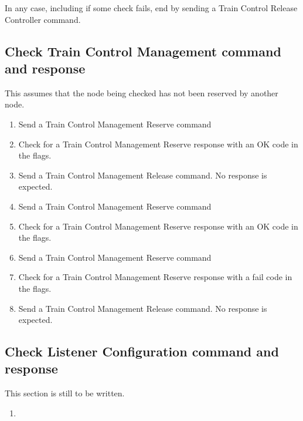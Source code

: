 In any case, including if some check fails, end by sending a Train Control Release
Controller command.


\subsection{Check Train Control Management command and response}

This assumes that the node being checked has not been reserved by another node.

\begin{enumerate}

    \item Send a Train Control Management Reserve command
    \item Check for a Train Control Management Reserve response with an OK code in the flags.

    \item Send a Train Control Management Release command.  No response is expected.

    \item Send a Train Control Management Reserve command
    \item Check for a Train Control Management Reserve response with an OK code in the flags.

    \item Send a Train Control Management Reserve command
    \item Check for a Train Control Management Reserve response with a fail code in the flags.
    
    \item Send a Train Control Management Release command.  No response is expected.

\end{enumerate}


\subsection{Check Listener Configuration command and response}

This section is still to be written.

\begin{enumerate}

    \item 

\end{enumerate}


  
